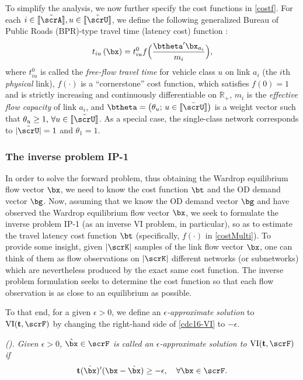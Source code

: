 \documentclass[3p]{elsarticle}
\DeclareMathOperator{\VI}{\text{VI}}
\begin{document}
To simplify the analysis, we now further specify the cost functions in
\eqref{costf}.  For each $i \in [\kern-0.15em[ \tilde\scrA
]\kern-0.15em], u \in [\kern-0.15em[ \tilde\scrU ]\kern-0.15em]$, we
define the following generalized Bureau of Public Roads (BPR)-type
travel time (latency cost) function \cite{branston1976link,
  noriega2007algorithmic, bertsimas2014data}:
\begin{align}{t_{iu}}\left( \bx \right) = {t^{{0}}_{iu}}f\Big( {\frac{{{\btheta}'{{\bx_{a_i}}} }}{{{m_{i}}}}} \Big), \label{costMulti}
\end{align}
where ${t^{{0}}_{iu}}$ is called the \textit{free-flow travel time} for
vehicle class $u$ on link ${a_i}$ (the $i$th \emph{physical} link),
$f(\cdot)$ is a ``cornerstone'' cost function, which satisfies $f(0)=1$
and is strictly increasing and continuously differentiable on
$\mathbb{R}_+$, ${m_{i}}$ is the \textit{effective flow capacity} of
link ${a_i}$, and ${\btheta} = \big( {\theta _u}; \, u \in
[\kern-0.15em[ \tilde\scrU ]\kern-0.15em] \big)$ is a weight vector such
that ${\theta _u} \geq 1, \,\forall u \in [\kern-0.15em[ \tilde\scrU
]\kern-0.15em]$. As a special case, the single-class network corresponds
to $|\tilde\scrU| = 1$ and $\theta_1 = 1$.
	
	
	
\subsubsection{The inverse problem IP-1} \label{sec InverseVI-multi}
	
In order to solve the forward problem, thus obtaining the Wardrop
equilibrium flow vector $\bx$, we need to know the cost function $\bt$
and the OD demand vector $\bg$. Now, assuming that we know the OD demand
vector $\bg$ and have observed the Wardrop equilibrium flow vector
$\bx$, we seek to formulate the inverse problem IP-1 (as an inverse VI
problem, in particular), so as to estimate the travel latency cost
function $\bt$ (specifically, $f(\cdot)$ in \eqref{costMulti}).  To
provide some insight, given $|\scrK|$ samples of the link flow vector
$\bx$, one can think of them as flow observations on $|\scrK|$ different
networks (or subnetworks) which are nevertheless produced by the exact
same cost function. The inverse problem formulation seeks to determine
the cost function so that each flow observation is as close to an
equilibrium as possible.
	
To that end, for a given $\epsilon > 0$, we define an
\textit{$\epsilon$-approximate solution} to $\VI(\mathbf{t}, \scrF)$ by
changing the right-hand side of \eqref{cdc16-VI} to $- \epsilon$.
\begin{defi}
  \label{cdc16-def3}
  \em{(\cite{bertsimas2014data})}. Given $\epsilon > 0$, $\hat{\bx} \in
  \scrF$ is called an \textit{$\epsilon$-approximate solution} to
  $\VI(\mathbf{t}, \scrF)$ if
\begin{equation} \label{cdc16-eq:defApproxEquil}
\mathbf{t}(\hat{\bx})'(\bx - \hat{\bx}) \geq - \epsilon, \quad
\forall \bx \in \scrF.
\end{equation}
\end{defi}
	
\end{document}
